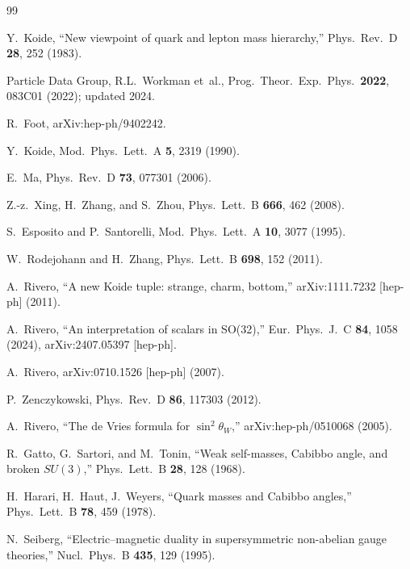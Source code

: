\documentclass[12pt,a4paper]{article}
\begin{document}
\begin{thebibliography}{99}

Y.~Koide, ``New viewpoint of quark and lepton mass hierarchy,''
Phys.\ Rev.\ D \textbf{28}, 252 (1983).

Particle Data Group, R.L.~Workman et~al.,
Prog.\ Theor.\ Exp.\ Phys.\ \textbf{2022}, 083C01 (2022);
updated 2024.

R.~Foot, arXiv:hep-ph/9402242.

Y.~Koide, Mod.\ Phys.\ Lett.\ A \textbf{5}, 2319 (1990).

E.~Ma, Phys.\ Rev.\ D \textbf{73}, 077301 (2006).

Z.-z.~Xing, H.~Zhang, and S.~Zhou,
Phys.\ Lett.\ B \textbf{666}, 462 (2008).

S.~Esposito and P.~Santorelli,
Mod.\ Phys.\ Lett.\ A \textbf{10}, 3077 (1995).

W.~Rodejohann and H.~Zhang,
Phys.\ Lett.\ B \textbf{698}, 152 (2011).

A.~Rivero, ``A new Koide tuple: strange, charm, bottom,''
arXiv:1111.7232 [hep-ph] (2011).

A.~Rivero, ``An interpretation of scalars in SO(32),''
Eur.\ Phys.\ J.\ C \textbf{84}, 1058 (2024),
arXiv:2407.05397 [hep-ph].

A.~Rivero, arXiv:0710.1526 [hep-ph] (2007).

P.~Zenczykowski, Phys.\ Rev.\ D \textbf{86}, 117303 (2012).

A.~Rivero, ``The de Vries formula for $\sin^2\theta_W$,''
arXiv:hep-ph/0510068 (2005).

R.~Gatto, G.~Sartori, and M.~Tonin,
``Weak self-masses, Cabibbo angle, and broken $SU(3)$,''
Phys.\ Lett.\ B \textbf{28}, 128 (1968).

H.~Harari, H.~Haut, J.~Weyers,
``Quark masses and Cabibbo angles,''
Phys.\ Lett.\ B \textbf{78}, 459 (1978).

N.~Seiberg, ``Electric--magnetic duality in supersymmetric
non-abelian gauge theories,'' Nucl.\ Phys.\ B \textbf{435}, 129
(1995).

\end{thebibliography}

\tableofcontents
\end{document}
